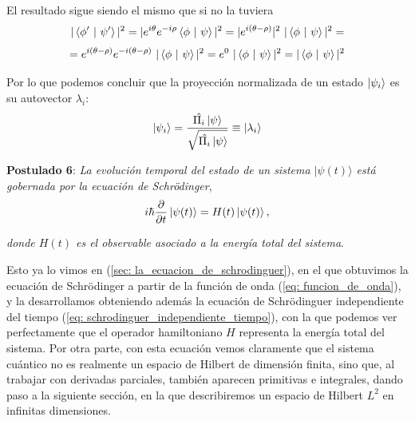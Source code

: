 \documentclass{article}
\numberwithin{equation}{section} %
\begin{document}
    \vspace{2.5mm}

    El resultado sigue siendo el mismo que si no la tuviera
    \begin{equation*}
        | \braket{\phi' \ | \ \psi'} | ^ {2} = | e^{i \theta} e^{-i \rho} \braket{\phi \ | \ \psi} | ^ {2} = | e^{i (\theta - \rho)} | ^ {2} \ | \braket{\phi \ | \ \psi} | ^ {2} =
    \end{equation*}
    \begin{equation*}
        = e^{i (\theta - \rho)} e^{-i(\theta - \rho)} \ | \braket{\phi \ | \ \psi} | ^ {2} = e^{0} \ | \braket{\phi \ | \ \psi} | ^ {2} = | \braket{\phi \ | \ \psi} | ^ {2}
    \end{equation*}

    \vspace{2.5mm}

    Por lo que podemos concluir que la proyección normalizada de un estado \( \ket{\psi_{i}} \) es su autovector \( \lambda_{i} \):
    \begin{equation}
        \ket{\psi_{i}} = \frac{\hat{\Pi_{i}} \ket{\psi}}{\sqrt{\hat{\Pi_{i}} \ket{\psi}}} \equiv \ket{\lambda_{i}}
    \end{equation}

    \vspace{10mm}

    \textbf{Postulado 6}: \textit{La evolución temporal del estado de un sistema \( |\psi(t)\rangle \) está gobernada por la ecuación de Schrödinger},
    \begin{equation}
        i\hbar \frac{\partial}{\partial t} \ket{\psi(t)} = H(t) \ket{\psi(t)},
        \label{eq:schrodinger}
    \end{equation}
    
    \textit{donde \( H(t) \) es el observable asociado a la energía total del sistema}.
    
    \vspace{5mm}

    Esto ya lo vimos en (\ref{sec: la_ecuacion_de_schrodinguer}), en el que obtuvimos la ecuación de Schrödinger a partir de la función de onda (\ref{eq: funcion_de_onda}), y la desarrollamos obteniendo además la ecuación de Schrödinguer independiente del tiempo (\ref{eq: schrodinguer_independiente_tiempo}), con la que podemos ver perfectamente que el operador hamiltoniano \( H \) representa la energía total del sistema. Por otra parte, con esta ecuación vemos claramente que el sistema cuántico no es realmente un espacio de Hilbert de dimensión finita, sino que, al trabajar con derivadas parciales, también aparecen primitivas e integrales, dando paso a la siguiente sección, en la que describiremos un espacio de Hilbert \( L^{2} \) en infinitas dimensiones.
    
\end{document}
